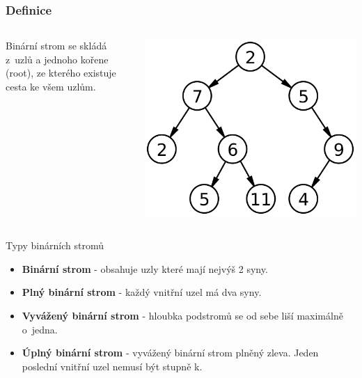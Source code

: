\documentclass[hyperref={unicode}]{beamer}
\begin{document}
\begin{frame}
\frametitle{Definice}
  \begin{columns}
    \begin{column}{.5\textwidth}
     \begin{block}{}
     \begin{center}
        Binární strom se skládá z~uzlů a jednoho kořene (root), 
        ze kterého existuje cesta ke všem uzlům.
    \end{center}
    \end{block}
    \end{column}%
    \begin{column}{.5\textwidth}
    \begin{block}{}
    \includegraphics[width=\textwidth]{Binary_tree.png}
    \end{block}
    \end{column}
  \end{columns}
\end{frame} 


\begin{frame}[fragile]{Typy binárních stromů}
\begin{itemize}
    \item \textbf{Binární strom} - obsahuje uzly které mají nejvýš 2 syny.
    \pause
    \item \textbf{Plný binární strom} - každý vnitřní uzel má dva syny.
    \pause
    \item \textbf{Vyvážený binární strom} - hloubka podstromů se od sebe liší maximálně o~jedna.
    \pause
    \item \textbf{Úplný binární strom} - vyvážený binární strom plněný zleva. Jeden poslední vnitřní uzel nemusí být stupně k.
\end{itemize}
\end{frame}
\end{document}
